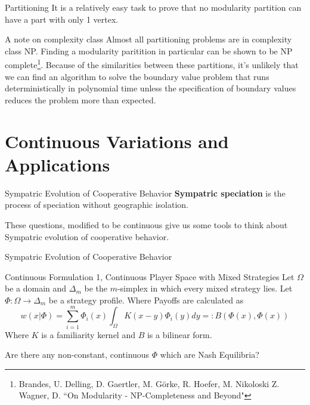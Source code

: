 \documentclass{beamer}
\begin{document}
\begin{frame}{Partitioning}
It is a relatively easy task to prove that no modularity partition can have a part with only 1 vertex. 
\begin{figure}
\end{figure}
\end{frame}
\begin{frame}
	{A note on complexity class}
	Almost all partitioning problems are in complexity class NP. Finding a modularity paritition in particular can be shown to be NP complete\footnote{Brandes, U. Delling, D. Gaertler, M. G\"orke, R. Hoefer, M. Nikoloski Z. Wagner, D. ``On Modularity - NP-Completeness and Beyond"}. Because of the similarities between these partitions, it's unlikely that we can find an algorithm to solve the boundary value problem that runs deterministically in polynomial time unless the specification of boundary values reduces the problem more than expected. 
\end{frame}
\section{Continuous Variations and Applications}
\begin{frame}{Sympatric Evolution of Cooperative Behavior}
	\textbf{Sympatric speciation} is the process of speciation without geographic isolation. 
	
	These questions, modified to be continuous give us some tools to think about Sympatric evolution of cooperative behavior. 
\end{frame}

\begin{frame}{Sympatric Evolution of Cooperative Behavior}
	\begin{block}{Continuous Formulation 1, Continuous Player Space with Mixed Strategies}
		Let $\Omega$ be a domain and $\Delta_m$ be the $m$-simplex in which every mixed strategy lies. Let $\Phi:\Omega \rightarrow\Delta_m$ be a strategy profile. Where Payoffs are calculated as 
		\begin{equation}
			w(x|\Phi)=\sum_{i=1}^m \Phi_i(x)\int_\Omega K(x-y)\Phi_i(y)dy =:B(\Phi(x),\Phi(x)) 
		\end{equation} 
		Where $K$ is a familiarity kernel and $B$ is a bilinear form. 
	\end{block}
	Are there any non-constant, continuous $\Phi$ which are Nash Equilibria? 
\end{frame}
\end{document}
